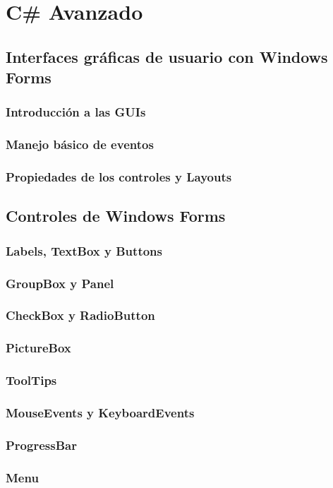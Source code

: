 \documentclass[12pt,a4paper]{report}
\begin{document}
\part{C\# Avanzado}
\chapter{ Interfaces gráficas de usuario con Windows Forms}
\section{Introducción a las GUIs}

\section{Manejo básico de eventos}
\section{Propiedades de los controles y Layouts}

\chapter{Controles de Windows Forms}
\section{Labels, TextBox y Buttons}
\section{GroupBox y Panel}
\section{CheckBox y RadioButton}
\section{PictureBox}
\section{ToolTips}
\section{MouseEvents y KeyboardEvents}
\section{ProgressBar}
\section{Menu}
\end{document}
